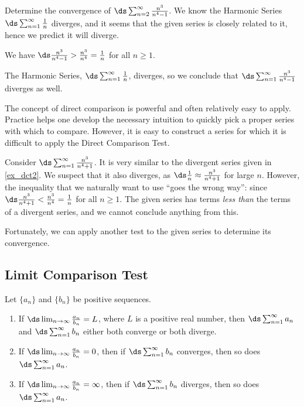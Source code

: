 \begin{example}\label{ex_dct2}
Determine the convergence of $\ds\sum_{n=2}^\infty \frac{n^3}{n^4-1}$.
\solution
We know the Harmonic Series $\ds\sum_{n=1}^\infty \frac1n$ diverges, and it seems that the given series is closely related to it, hence we predict it will diverge. 

We have $\ds \frac{n^3}{n^4-1}>\frac{n^3}{n^4}=\frac{1}{n}$ for all $n\geq 1$. 

The Harmonic Series, $\ds\sum_{n=1}^\infty \frac{1}{n}$,  diverges, so we conclude that $\ds\sum_{n=1}^\infty \frac{n^3}{n^4-1}$ diverges as well.
\end{example}

The concept of direct comparison is powerful and often relatively easy to apply. Practice helps one develop the necessary intuition to quickly pick a proper series with which to compare. However, it is easy to construct a series for which it is difficult to apply the Direct Comparison Test. 

Consider $\ds\sum_{n=1}^\infty \frac{n^3}{n^4+1}$. It is very similar to the divergent series given in \autoref{ex_dct2}. We suspect that it also diverges, as $\ds \frac 1n \approx \frac{n^3}{n^4+1}$ for large $n$. However, the inequality that we naturally want to use ``goes the wrong way'': since  $\ds \frac{n^3}{n^4+1}<\frac{n^3}{n^4}=\frac{1}{n}$ for all $n\geq 1$. The given series has terms \emph{less than} the terms of a divergent series, and we cannot conclude anything from this.

Fortunately, we can apply another test to the given series to determine its convergence.

\subsection{Limit Comparison Test}

\begin{theorem}\label{thm:series_limit_compare}
Let $\{a_n\}$ and $\{b_n\}$ be positive sequences.
\begin{enumerate}
	\item If $\ds\lim_{n\to\infty} \frac{a_n}{b_n} = L$, where $L$ is a positive real number, then $\ds \sum_{n=1}^\infty a_n$ and $\ds \sum_{n=1}^\infty b_n$ either both converge or both diverge.
	\item	If $\ds\lim_{n\to\infty} \frac{a_n}{b_n} = 0$, then if $\ds \sum_{n=1}^\infty b_n$ converges, then so does $\ds \sum_{n=1}^\infty a_n$.
	\item	If $\ds\lim_{n\to\infty} \frac{a_n}{b_n} = \infty$, then if $\ds \sum_{n=1}^\infty b_n$ diverges, then so does $\ds \sum_{n=1}^\infty a_n$.
\end{enumerate}
\end{theorem}

